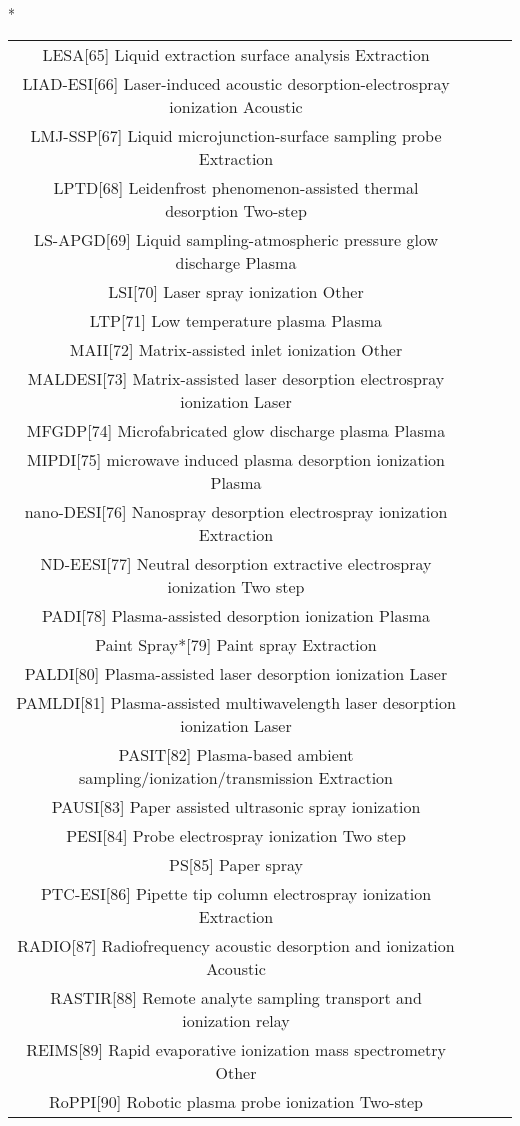\begin{table}{*}
\begin{tabular}{|c|c|c|l|}
LESA[65] Liquid extraction surface analysis Extraction \\
LIAD-ESI[66] Laser-induced acoustic desorption-electrospray ionization Acoustic \\
LMJ-SSP[67] Liquid microjunction-surface sampling probe Extraction \\
LPTD[68] Leidenfrost phenomenon-assisted thermal desorption Two-step \\
LS-APGD[69] Liquid sampling-atmospheric pressure glow discharge Plasma \\
LSI[70] Laser spray ionization Other \\
LTP[71] Low temperature plasma Plasma \\
MAII[72] Matrix-assisted inlet ionization Other \\
MALDESI[73] Matrix-assisted laser desorption electrospray ionization Laser \\
MFGDP[74] Microfabricated glow discharge plasma Plasma \\
MIPDI[75] microwave induced plasma desorption ionization Plasma \\
nano-DESI[76] Nanospray desorption electrospray ionization Extraction \\
ND-EESI[77] Neutral desorption extractive electrospray ionization Two step \\
PADI[78] Plasma-assisted desorption ionization Plasma \\
Paint Spray*[79] Paint spray Extraction \\
PALDI[80] Plasma-assisted laser desorption ionization Laser \\
PAMLDI[81] Plasma-assisted multiwavelength laser desorption ionization Laser \\
PASIT[82] Plasma-based ambient sampling/ionization/transmission Extraction \\
PAUSI[83] Paper assisted ultrasonic spray ionization  \\
PESI[84] Probe electrospray ionization Two step \\
PS[85] Paper spray  \\
PTC-ESI[86] Pipette tip column electrospray ionization Extraction \\
RADIO[87] Radiofrequency acoustic desorption and ionization Acoustic \\
RASTIR[88] Remote analyte sampling transport and ionization relay \\ 
REIMS[89] Rapid evaporative ionization mass spectrometry Other \\
RoPPI[90] Robotic plasma probe ionization Two-step \\

\end{tabular}
\end{table}
